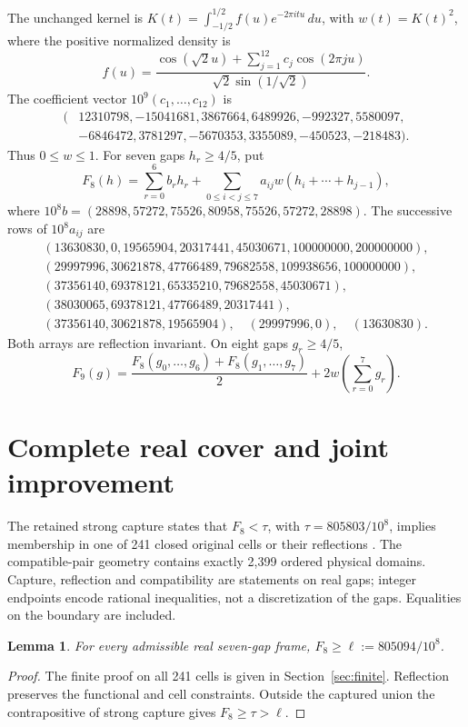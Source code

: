 \documentclass[11pt,a4paper]{article}
\newtheorem{lemma}[theorem]{Lemma}
\begin{document}
The unchanged kernel is $K(t)=\int_{-1/2}^{1/2}f(u)e^{-2\pi itu}\,du$,
with $w(t)=K(t)^2$, where the positive normalized density is
\[
 f(u)=\frac{\cos(\sqrt2u)+\sum_{j=1}^{12}c_j\cos(2\pi ju)}
 {\sqrt2\sin(1/\sqrt2)}.
\]
The coefficient vector $10^9(c_1,\ldots,c_{12})$ is
\[
\begin{split}
(&12310798,-15041681,3867664,6489926,-992327,5580097,\\
 &-6846472,3781297,-5670353,3355089,-450523,-218483).
\end{split}
\]
Thus $0\le w\le1$. For seven gaps $h_r\ge4/5$, put
\[
 F_8(h)=\sum_{r=0}^6b_rh_r+
 \sum_{0\le i<j\le7}a_{ij}w(h_i+\cdots+h_{j-1}),
\]
where $10^8b=(28898,57272,75526,80958,75526,57272,28898)$.
The successive rows of $10^8a_{ij}$ are
\[
\begin{array}{l}
(13630830,0,19565904,20317441,45030671,100000000,200000000),\\
(29997996,30621878,47766489,79682558,109938656,100000000),\\
(37356140,69378121,65335210,79682558,45030671),\\
(38030065,69378121,47766489,20317441),\\
(37356140,30621878,19565904),\quad(29997996,0),\quad(13630830).
\end{array}
\]
Both arrays are reflection invariant. On eight gaps $g_r\ge4/5$,
\[
 F_9(g)=\frac{F_8(g_0,\ldots,g_6)+F_8(g_1,\ldots,g_7)}2
            +2w\left(\sum_{r=0}^7g_r\right).
\]

\section{Complete real cover and joint improvement}\label{sec:cover}

The retained strong capture states that $F_8<\tau$, with
$\tau=805803/10^8$, implies membership in one of 241 closed original
cells or their reflections \cite{PC8,Ninth}. The compatible-pair
geometry contains exactly 2,399 ordered physical domains. Capture,
reflection and compatibility are statements on real gaps; integer
endpoints encode rational inequalities, not a discretization of the
gaps. Equalities on the boundary are included.

\begin{lemma}\label{lem:frame}
For every admissible real seven-gap frame,
$F_8\ge\ell:=805094/10^8$.
\end{lemma}
\begin{proof}
The finite proof on all 241 cells is given in
Section~\ref{sec:finite}. Reflection preserves the functional and
cell constraints. Outside the captured union the contrapositive of
strong capture gives $F_8\ge\tau>\ell$.
\end{proof}
\end{document}
